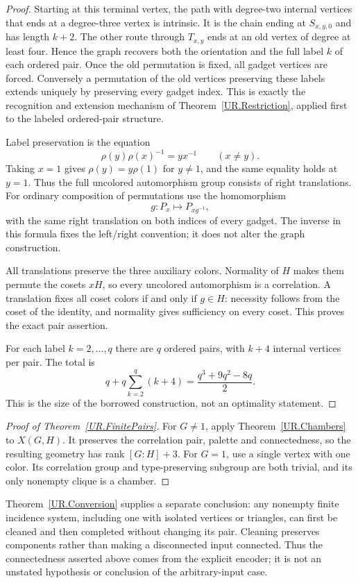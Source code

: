 \begin{proof}
Starting at this terminal vertex, the path with degree-two internal vertices
that ends at a degree-three vertex is intrinsic. It is the chain ending at
$S_{x,y,0}$ and has length $k+2$. The other route through $T_{x,y}$ ends at
an old vertex of degree at least four. Hence the graph recovers both the
orientation and the full label $k$ of each ordered pair. Once the old
permutation is fixed, all gadget vertices are forced. Conversely a permutation
of the old vertices preserving these labels extends uniquely by preserving
every gadget index. This is exactly the recognition and extension mechanism
of Theorem~\ref{UR.Restriction}, applied first to the labeled ordered-pair structure.

Label preservation is the equation
\[
 \rho(y)\rho(x)^{-1}=yx^{-1}\qquad(x\ne y).
\]
Taking $x=1$ gives $\rho(y)=y\rho(1)$ for $y\ne1$, and the same equality
holds at $y=1$. Thus the full uncolored automorphism group consists of right
translations. For ordinary composition of permutations use the homomorphism
\[
 g:P_x\longmapsto P_{xg^{-1}},
\]
with the same right translation on both indices of every gadget.
The inverse in this formula fixes the left/right convention; it does not
alter the graph construction.

All translations preserve the three auxiliary colors. Normality of $H$
makes them permute the cosets $xH$, so every uncolored automorphism is a
correlation. A translation fixes all coset colors if and only if $g\in H$:
necessity follows from the coset of the identity, and normality gives
sufficiency on every coset. This proves the exact pair assertion.

For each label $k=2,\ldots,q$ there are $q$ ordered pairs, with $k+4$
internal vertices per pair. The total is
\[
 q+q\sum_{k=2}^{q}(k+4)=\frac{q^3+9q^2-8q}{2}.
\]
This is the size of the borrowed construction, not an optimality statement.
\end{proof}

\begin{proof}[Proof of Theorem~\ref{UR.FinitePairs}]
For $G\ne1$, apply Theorem~\ref{UR.Chambers} to
$X(G,H)$. It preserves the correlation pair, palette and connectedness,
so the resulting geometry has rank $[G:H]+3$. For $G=1$, use a single
vertex with one color. Its correlation group and type-preserving subgroup
are both trivial, and its only nonempty clique is a chamber.
\end{proof}

Theorem~\ref{UR.Conversion} supplies a separate conclusion: any nonempty
finite incidence system, including one with isolated vertices or triangles,
can first be cleaned and then completed without changing its pair. Cleaning
preserves components rather than making a disconnected input connected.
Thus the connectedness asserted above comes from the explicit encoder;
it is not an unstated hypothesis or conclusion of the arbitrary-input case.
